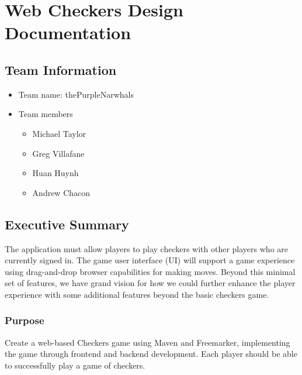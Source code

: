 \hypertarget{web-checkers-design-documentation}{%
\section{Web Checkers Design
Documentation}\label{web-checkers-design-documentation}}

\hypertarget{team-information}{%
\subsection{Team Information}\label{team-information}}

\usepackage{float}

\begin{itemize}
\tightlist
\item
  Team name: thePurpleNarwhals
\item
  Team members

  \begin{itemize}
  \tightlist
  \item
    Michael Taylor
  \item
    Greg Villafane
  \item
    Huan Huynh
  \item
    Andrew Chacon
  \end{itemize}
\end{itemize}

\hypertarget{executive-summary}{%
\subsection{Executive Summary}\label{executive-summary}}

The application must allow players to play checkers with other players
who are currently signed in. The game user interface (UI) will support a
game experience using drag-and-drop browser capabilities for making
moves. Beyond this minimal set of features, we have grand vision for how
we could further enhance the player experience with some additional
features beyond the basic checkers game.

\hypertarget{purpose}{%
\subsubsection{Purpose}\label{purpose}}

Create a web-based Checkers game using Maven and Freemarker,
implementing the game through frontend and backend development. Each
player should be able to successfully play a game of checkers.

